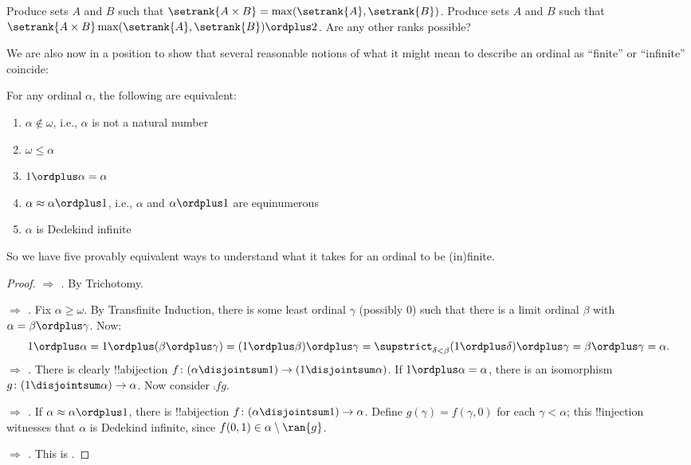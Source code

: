 \documentclass[../../../include/open-logic-section]{subfiles}
\begin{document}
\begin{prob}
Produce sets $A$ and $B$ such that $\setrank{A \times B}=
\max(\setrank{A}, \setrank{B})$. Produce sets $A$ and $B$ such that
$\setrank{A \times B}\max(\setrank{A}, \setrank{B}) \ordplus  2$. Are
any other ranks possible?
\end{prob}

We are also now in a position to show that several reasonable notions
of what it might mean to describe an ordinal as ``finite'' or ``infinite'' coincide:

\begin{lem}
For any ordinal $\alpha$, the following are equivalent:
\begin{enumerate}
	\item{} $\alpha\notin \omega$, i.e.,
	$\alpha$ is not a natural number
	\item{} $\omega \leq \alpha$ 
	\item{} $1 \ordplus  \alpha = \alpha$ 
	\item{} $\alpha \approx \alpha\ordplus 1$,
	i.e., $\alpha$ and $\alpha\ordplus 1$ are equinumerous
	\item{} $\alpha$ is Dedekind infinite	
	\end{enumerate}
\end{lem}
\noindent
So we have five provably equivalent ways to understand what it takes for an ordinal to be (in)finite.

\begin{proof}
\emph{ $\Rightarrow$ .} By
Trichotomy. 

\emph{ $\Rightarrow$ .} Fix
$\alpha \geq \omega$. By Transfinite Induction, there is some least
ordinal $\gamma$ (possibly $0$) such that there is a limit ordinal
$\beta$ with $\alpha = \beta \ordplus \gamma$. Now:
\[
	1 \ordplus \alpha =  
	1 \ordplus (\beta \ordplus \gamma) = 
	(1 \ordplus \beta) \ordplus \gamma =  
	\supstrict_{\delta < \beta} (1 \ordplus  \delta) \ordplus  \gamma = 
	\beta \ordplus  \gamma = 
	\alpha.
\]
\emph{ $\Rightarrow$ .} There is
clearly !!a{bijection} $f \colon (\alpha \disjointsum 1) \to (1
\disjointsum \alpha)$. If $1 \ordplus \alpha = \alpha$, there is an
isomorphism $g \colon (1 \disjointsum \alpha) \to \alpha$. Now
consider $\comp{f}{g}$.

\emph{ $\Rightarrow$ .} If
$\alpha \approx \alpha \ordplus 1$, there is !!a{bijection} $f \colon
(\alpha \disjointsum 1) \to \alpha$. Define $g(\gamma) = f(\gamma, 0)$
for each $\gamma < \alpha$; this !!{injection} witnesses that $\alpha$
is Dedekind infinite, since $f(0,1) \in \alpha \setminus \ran{g}$. 

\emph{ $\Rightarrow$ .} This
is .
\end{proof}
\end{document}
